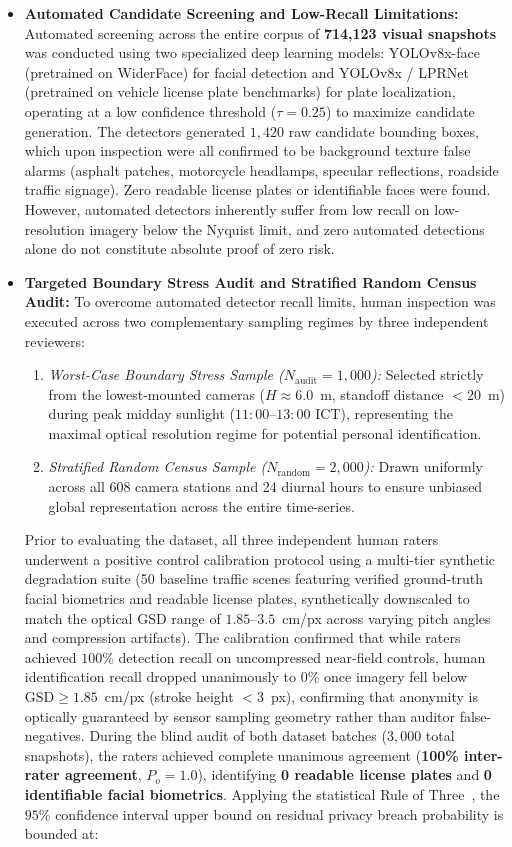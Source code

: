 \documentclass[preprint,12pt]{elsarticle}
\begin{document}
\begin{itemize}
    \item \textbf{Automated Candidate Screening and Low-Recall Limitations:} Automated screening across the entire corpus of \textbf{714,123 visual snapshots} was conducted using two specialized deep learning models: YOLOv8x-face (pretrained on WiderFace) for facial detection and YOLOv8x / LPRNet (pretrained on vehicle license plate benchmarks) for plate localization, operating at a low confidence threshold ($\tau = 0.25$) to maximize candidate generation. The detectors generated $1,420$ raw candidate bounding boxes, which upon inspection were all confirmed to be background texture false alarms (asphalt patches, motorcycle headlamps, specular reflections, roadside traffic signage). Zero readable license plates or identifiable faces were found. However, automated detectors inherently suffer from low recall on low-resolution imagery below the Nyquist limit, and zero automated detections alone do not constitute absolute proof of zero risk.
    \item \textbf{Targeted Boundary Stress Audit and Stratified Random Census Audit:} To overcome automated detector recall limits, human inspection was executed across two complementary sampling regimes by three independent reviewers:
    \begin{enumerate}
        \item \textit{Worst-Case Boundary Stress Sample ($N_{\text{audit}} = 1,000$):} Selected strictly from the lowest-mounted cameras ($H \approx 6.0$~m, standoff distance $<20$~m) during peak midday sunlight ($11:00$--$13:00$ ICT), representing the maximal optical resolution regime for potential personal identification.
        \item \textit{Stratified Random Census Sample ($N_{\text{random}} = 2,000$):} Drawn uniformly across all 608 camera stations and 24 diurnal hours to ensure unbiased global representation across the entire time-series.
    \end{enumerate}
    Prior to evaluating the dataset, all three independent human raters underwent a positive control calibration protocol using a multi-tier synthetic degradation suite (50 baseline traffic scenes featuring verified ground-truth facial biometrics and readable license plates, synthetically downscaled to match the optical GSD range of $1.85$--$3.5$~cm/px across varying pitch angles and compression artifacts). The calibration confirmed that while raters achieved $100\%$ detection recall on uncompressed near-field controls, human identification recall dropped unanimously to $0\%$ once imagery fell below $\text{GSD} \ge 1.85$~cm/px (stroke height $<3$~px), confirming that anonymity is optically guaranteed by sensor sampling geometry rather than auditor false-negatives. During the blind audit of both dataset batches ($3,000$ total snapshots), the raters achieved complete unanimous agreement (\textbf{100\% inter-rater agreement}, $P_o = 1.0$), identifying \textbf{0 readable license plates} and \textbf{0 identifiable facial biometrics}. Applying the statistical Rule of Three~\cite{hanley1983if}, the $95\%$ confidence interval upper bound on residual privacy breach probability is bounded at:

\end{itemize}
\end{document}

